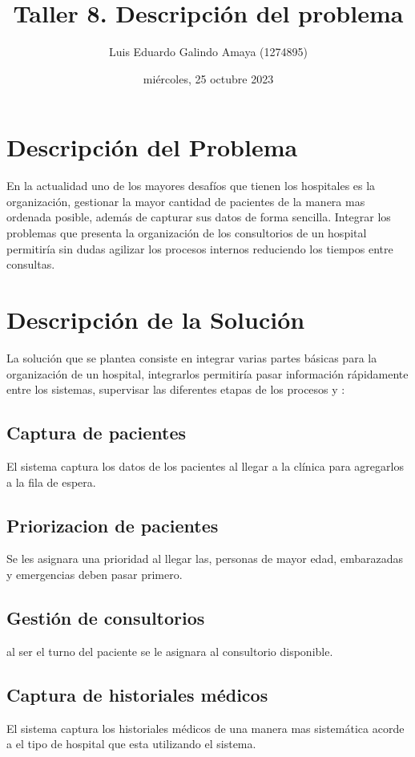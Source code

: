 \documentclass[11pt]{article}
\author{Luis Eduardo Galindo Amaya (1274895)}
\date{miércoles, 25 octubre 2023}
\title{Taller 8. Descripción del problema}
\begin{document}
\makeatletter
\makeatletter
{}
\tableofcontents
\pagebreak
{}

\section{Descripción del Problema}
\label{sec:orgc831262}
En la actualidad uno de los mayores desafíos que tienen los hospitales es la 
organización, gestionar la mayor cantidad de pacientes de la manera mas ordenada 
posible, además de capturar sus datos de forma sencilla. Integrar los problemas
que presenta la organización de los consultorios de un hospital permitiría sin
dudas agilizar los procesos internos reduciendo los tiempos entre consultas.

\section{Descripción de la Solución}
\label{sec:org20499e3}
La solución que se plantea consiste en integrar varias partes básicas para la 
organización de un hospital, integrarlos permitiría pasar información rápidamente 
entre los sistemas, supervisar las diferentes etapas de los procesos y  :

\subsection{Captura de pacientes}
\label{sec:org6debec6}
El sistema captura los datos de los pacientes al llegar a la clínica para 
agregarlos a la fila de espera.

\subsection{Priorizacion de pacientes}
\label{sec:org2b9784e}
Se les asignara una prioridad al llegar las, personas de mayor edad, embarazadas
y emergencias deben pasar primero.

\subsection{Gestión de consultorios}
\label{sec:orge1a9264}
al ser el turno del paciente se le asignara al consultorio disponible. 

\subsection{Captura de historiales médicos}
\label{sec:org413ff59}
El sistema captura los historiales médicos de una manera mas sistemática acorde
a el tipo de hospital que esta utilizando el sistema.
\end{document}
